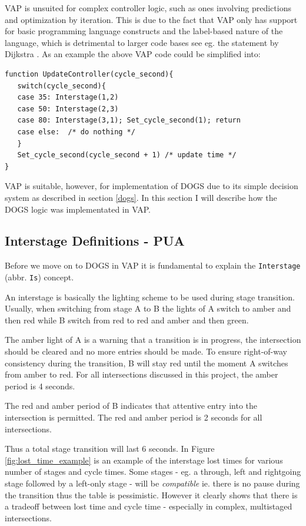 VAP is unsuited for complex controller logic, such as ones involving predictions and optimization by iteration. This is due to the fact that VAP only has support for basic programming language constructs and the label-based nature of the language, which is detrimental to larger code bases see eg. the statement by Dijkstra \cite{nogoto}. As an example the above VAP code could be simplified into:

\begin{verbatim}
function UpdateController(cycle_second){
   switch(cycle_second){
   case 35: Interstage(1,2)
   case 50: Interstage(2,3)
   case 80: Interstage(3,1); Set_cycle_second(1); return
   case else:  /* do nothing */
   }
   Set_cycle_second(cycle_second + 1) /* update time */
}
\end{verbatim}

VAP is suitable, however, for implementation of DOGS due to its simple decision system as described in section \ref{dogs}. In this section I will describe how the DOGS logic was implementated in VAP.

\subsection*{Interstage Definitions - PUA}
Before we move on to DOGS in VAP it is fundamental to explain the \verb|Interstage| (abbr. \verb|Is|) concept.

An interstage is basically the lighting scheme to be used during stage transition. Usually, when switching from stage A to B the lights of A switch to amber and then red while B switch from red to red and amber and then green.

The amber light of A is a warning that a transition is in progress, the intersection should be cleared and no more entries should be made. To ensure right-of-way consistency during the transition, B will stay red until the moment A switches from amber to red. For all intersections discussed in this project, the amber period is 4 seconds.

The red and amber period of B indicates that attentive entry into the intersection is permitted. The red and amber period is 2 seconds for all intersections.

Thus a total stage transition will last 6 seconds. In Figure \ref{fig:lost_time_example} is an example of the interstage lost times for various number of stages and cycle times. Some stages - eg. a through, left and rightgoing stage followed by a left-only stage - will be \textit{compatible} ie. there is no pause during the transition thus the table is pessimistic. However it clearly shows that there is a tradeoff between lost time and cycle time - especially in complex, multistaged intersections.

